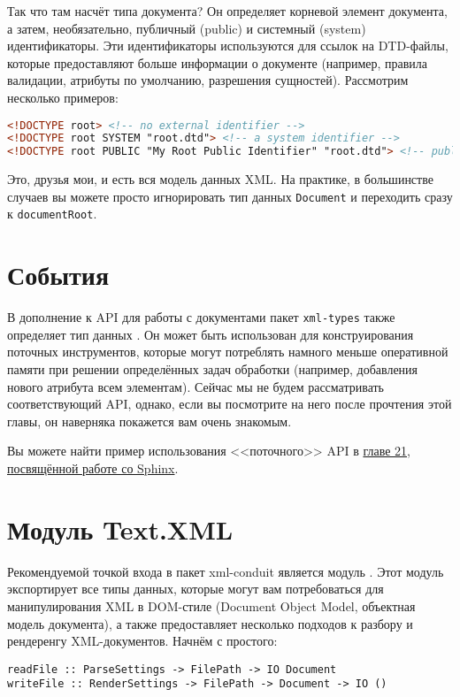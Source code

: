 Так что там насчёт типа документа? Он определяет корневой элемент документа, а затем, необязательно, публичный (public) и системный (system) идентификаторы. Эти идентификаторы используются для ссылок на DTD-файлы, которые предоставляют больше информации о документе (например, правила валидации, атрибуты по умолчанию, разрешения сущностей). Рассмотрим несколько примеров:
\begin{lstlisting}[language=HTML]
<!DOCTYPE root> <!-- no external identifier -->
<!DOCTYPE root SYSTEM "root.dtd"> <!-- a system identifier -->
<!DOCTYPE root PUBLIC "My Root Public Identifier" "root.dtd"> <!-- public identifiers have a system ID as well -->
\end{lstlisting}

Это, друзья мои, и есть вся модель данных XML. На практике, в большинстве случаев вы можете просто игнорировать тип данных \lstinline!Document! и переходить сразу к \lstinline!documentRoot!.

\section{События} %
В дополнение к API для работы с документами пакет \lstinline!xml-types! также определяет тип данных . Он может быть использован для конструирования поточных инструментов, которые могут потреблять намного меньше оперативной памяти при решении определённых задач обработки (например, добавления нового атрибута всем элементам). Сейчас мы не будем рассматривать соответствующий API, однако, если вы посмотрите на него после прочтения этой главы, он наверняка покажется вам очень знакомым.

\begin{remark}
Вы можете найти пример использования <<поточного>> API в \hyperref[chap:sphinx]{главе 21, посвящённой работе со Sphinx}.
\end{remark}

\section{Модуль Text.XML}
Рекомендуемой точкой входа в пакет xml-conduit является модуль . Этот модуль экспортирует все типы данных, которые могут вам потребоваться для манипулирования XML в DOM-стиле (Document Object Model, объектная модель документа), а также предоставляет несколько подходов к разбору и рендеренгу XML-документов. Начнём с простого:
\begin{lstlisting}
readFile :: ParseSettings -> FilePath -> IO Document
writeFile :: RenderSettings -> FilePath -> Document -> IO ()
\end{lstlisting}

